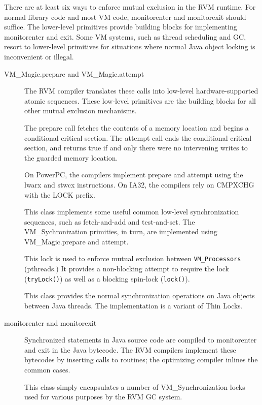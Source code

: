 There are at least six ways to enforce mutual exclusion in the
RVM runtime.  For normal library code and most VM code, monitorenter and
monitorexit should suffice.  The lower-level primitives provide 
building blocks for implementing monitorenter and exit. Some VM systems,
such as thread scheduling and GC, resort to lower-level primitives for
situations where normal Java object locking is inconvenient or illegal.
\begin{description}
\item [VM\_Magic.prepare and VM\_Magic.attempt]
The RVM compiler translates these 
calls into low-level
hardware-supported atomic sequences.  These low-level primitives are the 
building blocks for all other mutual exclusion mechanisms. 

The prepare call fetches the
contents of a memory location and begins a conditional critical section.
The attempt call ends the conditional critical section, and returns true
if and only there were no intervening writes to the guarded memory
location.

On PowerPC, the compilers implement prepare and attempt using the lwarx
and stwcx instructions.  On IA32, the compilers rely on CMPXCHG with the
LOCK prefix.
\item []
This class implements some useful common low-level synchronization
sequences, such as fetch-and-add and test-and-set.  The VM\_Sychronization
primities, in turn, are implemented using VM\_Magic.prepare and attempt.
\item [
]
This lock is used to enforce mutual exclusion between {\tt VM\_Processors}
(pthreads.)  It provides a non-blocking attempt to require the lock
({\tt tryLock()}) as well as a blocking spin-lock ({\tt lock()}).
\item [
]
This class provides the normal synchronization operations on Java objects
between Java threads.  The implementation is a variant of Thin Locks.
\item [monitorenter and monitorexit]
Synchronized statements in Java source code are compiled to monitorenter
and exit in the Java bytecode.  The RVM compilers implement these
bytecodes by inserting calls to  routines; 
the optimizing
compiler inlines the common cases.
\item []
This class simply encapsulates a number of VM\_Synchronization locks 
used for various purposes by the RVM GC system.

\end{description}

